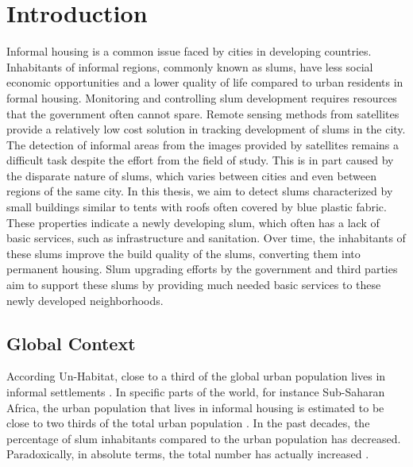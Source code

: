 \section{Introduction}

Informal housing is a common issue faced by cities in developing countries. Inhabitants of informal regions, commonly known as slums, have less social economic opportunities and a lower quality of life compared to urban residents in formal housing. Monitoring and controlling slum development requires resources that the government often cannot spare. Remote sensing methods from satellites provide a relatively low cost solution in tracking development of slums in the city. The detection of informal areas from the images provided by satellites remains a difficult task despite the effort from the field of study. This is in part caused by the disparate nature of slums, which varies between cities and even between regions of the same city. In this thesis, we aim to detect slums characterized by small buildings similar to tents with roofs often covered by blue plastic fabric. These properties indicate a newly developing slum, which often has a lack of basic services, such as infrastructure and sanitation. Over time, the inhabitants of these slums improve the build quality of the slums, converting them into permanent housing. Slum upgrading efforts by the government and third parties aim to support these slums by providing much needed basic services to these newly developed neighborhoods.


\subsection{Global Context}
According Un-Habitat, close to a third of the global urban population lives in informal settlements \cite{2016state}. In specific parts of the world, for instance Sub-Saharan Africa, the urban population that lives in informal housing is estimated to be close to two thirds of the total urban population \cite{un2013planning}. In the past decades, the percentage of slum inhabitants compared to the urban population has decreased. Paradoxically, in absolute terms, the total number has actually increased \cite{2016state}.

